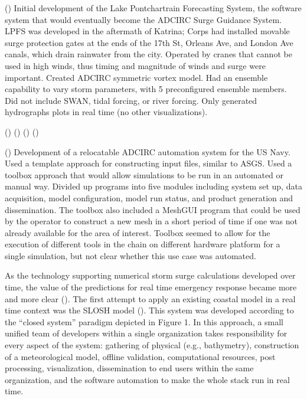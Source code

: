 \documentclass[12pt]{article}
\begin{document}
(\cite{FlemingJG2008}) Initial development of the Lake Pontchartrain 
Forecasting System, the software system that would eventually become 
the ADCIRC Surge Guidance System. LPFS was developed in the 
aftermath of Katrina; Corps had installed movable surge protection 
gates at the ends of the 17th St, Orleans Ave, and London Ave 
canals, which drain rainwater from the city. Operated by cranes that 
cannot be used in high winds, thus timing and magnitude of winds and 
surge were important. Created ADCIRC symmetric vortex model. Had an 
ensemble capability to vary storm parameters, with 5 preconfigured 
ensemble members. Did not include SWAN, tidal forcing, or river 
forcing. Only generated hydrographs plots in real time (no other 
visualizations).

(\cite {BlainCA1998}) (\cite{BlainCA2002}) (\cite{BlainCA2002}) (\cite {BlainCA2002Tidal})

(\cite{ChuP2009}) Development of a relocatable ADCIRC automation 
system for the US Navy. Used a template approach for constructing 
input files, similar to ASGS. Used a toolbox approach that would 
allow simulations to be run in an automated or manual way. Divided 
up programs into five modules including system set up, data 
acquisition, model configuration, model run status, and product 
generation and dissemination. The toolbox also included a MeshGUI 
program that could be used by the operator to construct a new mesh 
in a short period of time if one was not already available for the 
area of interest. Toolbox seemed to allow for the execution of 
different tools in the chain on different hardware platform for a 
single simulation, but not clear whether this use case was automated. 

As the technology supporting numerical storm surge calculations 
developed over time, the value of the predictions for real time 
emergency response became more and more clear (\cite 
{JelesnianskiCP1992}). The first attempt to apply an existing 
coastal model in a real time context was the SLOSH model (\cite 
{JelesnianskiCP1992}). This system was developed according to the 
``closed system'' paradigm depicted in Figure 1. In this approach, a 
small unified team of developers within a single organization takes 
responsibility for every aspect of the system: gathering of physical 
(e.g., bathymetry), construction of a meteorological model, offline 
validation, computational resources, post processing, visualization, 
dissemination to end users within the same organization, and the 
software automation to make the whole stack run in real time. 
\end{document}
